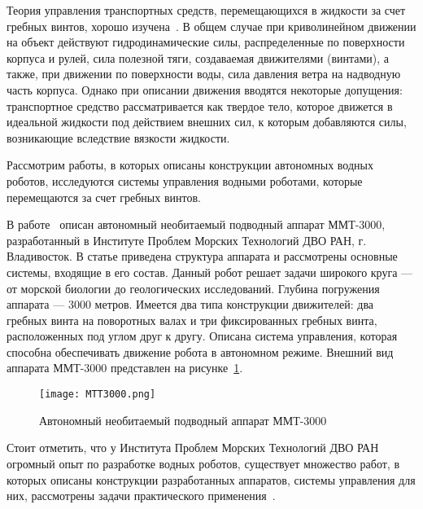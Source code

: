 Теория управления транспортных средств, перемещающихся в жидкости за счет гребных винтов, хорошо изучена~\cite{Ageev, Fossen, Fossen2, Basin_Anfimov_1961, Lebedev_Pershits_1969}. В общем случае при криволинейном движении на объект действуют гидродинамические силы, распределенные по поверхности корпуса и рулей, сила полезной тяги, создаваемая движителями (винтами), а также, при движении по поверхности воды, сила давления ветра на надводную часть корпуса. Однако при описании движения вводятся некоторые допущения: транспортное средство рассматривается как твердое тело, которое движется в идеальной жидкости под действием внешних сил, к которым добавляются силы, возникающие вследствие вязкости жидкости.

Рассмотрим работы, в которых описаны конструкции автономных водных роботов, исследуются системы управления водными роботами, которые перемещаются за счет гребных винтов.

В работе~\cite{Gornak_MMT3000} описан автономный необитаемый подводный аппарат ММТ-3000, разработанный в Институте Проблем Морских Технологий ДВО РАН, г. Владивосток. В статье приведена структура аппарата и рассмотрены основные системы, входящие в его состав. Данный робот решает задачи широкого круга --- от морской биологии до геологических исследований. Глубина погружения аппарата --- 3000 метров. Имеется два типа конструкции движителей: два гребных винта на поворотных валах и три фиксированных гребных винта, расположенных под углом друг к другу. Описана система управления, которая способна обеспечивать движение робота в автономном режиме. Внешний вид аппарата ММТ-3000 представлен на рисунке~\ref{MTT3000}. 

\begin{figure}[h]
	\centering
	\texttt{[image: MTT3000.png]}%
	\caption{Автономный необитаемый подводный аппарат ММТ-3000}
	\label{MTT3000}
\end{figure}

Стоит отметить, что у Института Проблем Морских Технологий ДВО РАН огромный опыт по разработке водных роботов, существует множество работ, в которых описаны конструкции разработанных аппаратов, системы управления для них, рассмотрены задачи практического применения~\cite{Matvienko_2017, Naumov_2011, Boreyko_2011, Iznarcev_2007, Vaulin_2017, Inzarcev_2016}.


